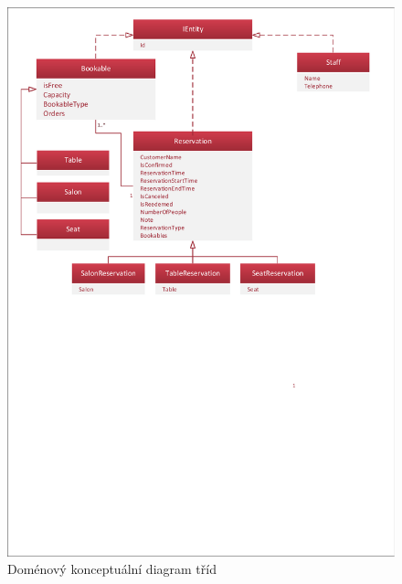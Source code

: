 \newpage
\begin{figure}[h!]
\begin{center}
\includegraphics[scale=0.75]{../02_Vysledne_modely/05_1_ConceptualClassDiagram.pdf}
\caption{Doménový konceptuální diagram tříd}
\label{fig:communication09-1}
\end{center}
\end{figure}





